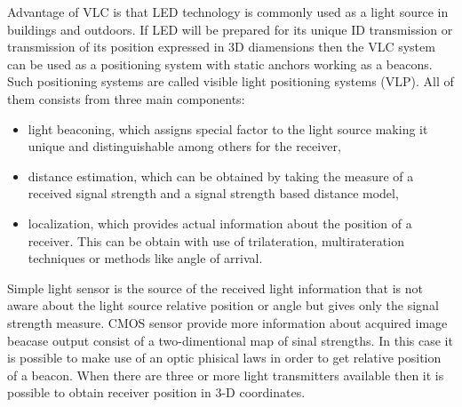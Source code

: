\documentclass[../main.tex]{subfiles}
\begin{document}
Advantage of VLC is that LED technology is commonly used as a light source in buildings and outdoors. If LED will be prepared for its unique ID transmission or transmission of its position expressed in 3D diamensions then the VLC system can be used as a positioning system with static anchors working as a beacons. Such positioning systems are called visible light positioning systems (VLP). All of them consists from three main components:
\begin{itemize}
	\item light beaconing, which assigns special factor to the light source making it unique and distinguishable among others for the receiver,
	\item distance estimation, which can be obtained by taking the measure of a received signal strength and a signal strength based distance model,
	\item localization, which provides actual information about the position of a receiver. This can be obtain with use of trilateration, multirateration techniques or methods like angle of arrival.
\end{itemize}

Simple light sensor is the source of the received light information that is not aware about the light source relative position or angle but gives only the signal strength measure. CMOS sensor provide more information about acquired image beacase output consist of a two-dimentional map of sinal strengths. In this case it is possible to make use of an optic phisical laws in order to get relative position of a beacon. When there are three or more light transmitters available then it is possible to obtain receiver position in 3-D coordinates.
\end{document}
